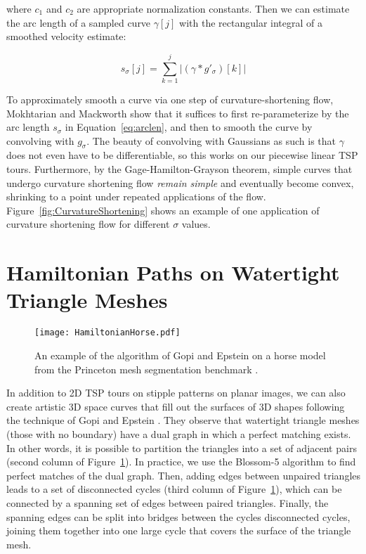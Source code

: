 \documentclass[runningheads]{llncs}
\begin{document}
where $c_1$ and $c_2$ are appropriate normalization constants.  Then we can estimate the arc length of a sampled curve $\gamma[j]$ with the rectangular integral of a smoothed velocity estimate:

\begin{equation}
  \label{eq:arclen}
  s_{\sigma}[j] = \sum_{k=1}^j |(\gamma * g'_{\sigma})[k]|
\end{equation}

To approximately smooth a curve via one step of curvature-shortening flow, Mokhtarian and Mackworth \cite{mokhtarian1992theory} show that it suffices to first re-parameterize by the arc length $s_{\sigma}$ in Equation~\ref{eq:arclen}, and then to smooth the curve by convolving with $g_{\sigma}$.  The beauty of convolving with Gaussians as such is that $\gamma$ does not even have to be differentiable, so this works on our piecewise linear TSP tours.  Furthermore, by the Gage-Hamilton-Grayson theorem, simple curves that undergo curvature shortening flow {\em remain simple} and eventually become convex, shrinking to a point under repeated applications of the flow.  Figure~\ref{fig:CurvatureShortening} shows an example of one application of curvature shortening flow for different $\sigma$ values.



\section{Hamiltonian Paths on Watertight Triangle Meshes}
\label{sec:hamiltonian}

\begin{figure}
  \centering
  \texttt{[image: HamiltonianHorse.pdf]}
  \caption{An example of the algorithm of Gopi and Epstein \cite{gopi2004single} on a horse model from the Princeton mesh segmentation benchmark \cite{Chen:2009:ABF}.}
  \label{fig:HamiltonianHorse}
\end{figure}

In addition to 2D TSP tours on stipple patterns on planar images, we can also create artistic 3D space curves that fill out the surfaces of 3D shapes following the technique of Gopi and Epstein \cite{gopi2004single}.  They observe that watertight triangle meshes (those with no boundary) have a dual graph in which a perfect matching exists.  In other words, it is possible to partition the triangles into a set of adjacent pairs (second column of Figure~\ref{fig:HamiltonianHorse}).  In practice, we use the Blossom-5 algorithm \cite{kolmogorov2009blossom} to find perfect matches of the dual graph.  Then, adding edges between unpaired triangles leads to a set of disconnected cycles (third column of Figure~\ref{fig:HamiltonianHorse}), which can be connected by a spanning set of edges between paired triangles.  Finally, the spanning edges can be split into bridges between the cycles disconnected cycles, joining them together into one large cycle that covers the surface of the triangle mesh.
\end{document}
